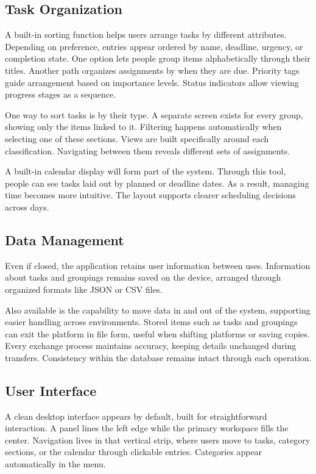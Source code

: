 \documentclass{article}
\begin{document}
\subsection{Task Organization}
A built-in sorting function helps users arrange tasks by different attributes. Depending on preference, entries appear ordered by name, deadline, urgency, or completion state. One option lets people group items alphabetically through their titles. Another path organizes assignments by when they are due. Priority tags guide arrangement based on importance levels. Status indicators allow viewing progress stages as a sequence.

One way to sort tasks is by their type. A separate screen exists for every group, showing only the items linked to it. Filtering happens automatically when selecting one of these sections. Views are built specifically around each classification. Navigating between them reveals different sets of assignments.

A built-in calendar display will form part of the system. Through this tool, people can see tasks laid out by planned or deadline dates. As a result, managing time becomes more intuitive. The layout supports clearer scheduling decisions across days.

\subsection{Data Management}
Even if closed, the application retains user information between uses. Information about tasks and groupings remains saved on the device, arranged through organized formats like JSON or CSV files.

Also available is the capability to move data in and out of the system, supporting easier handling across environments. Stored items such as tasks and groupings can exit the platform in file form, useful when shifting platforms or saving copies. Every exchange process maintains accuracy, keeping details unchanged during transfers. Consistency within the database remains intact through each operation.


\subsection{User Interface}
A clean desktop interface appears by default, built for straightforward interaction. A panel lines the left edge while the primary workspace fills the center. Navigation lives in that vertical strip, where users move to tasks, category sections, or the calendar through clickable entries. Categories appear automatically in the menu.
\end{document}
